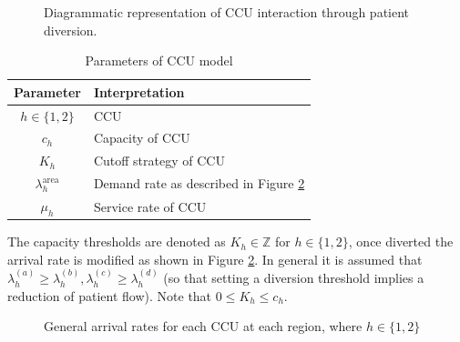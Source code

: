 \documentclass[a4paper,11pt]{article}
\begin{document}
\begin{figure}[!htbp]
\begin{center}
\caption{Diagrammatic representation of CCU interaction through patient diversion.}\label{diagramofdiversion}
\end{center}
\end{figure}


\begin{table}[!hbtp]
\begin{center}
\begin{tabular}{cl}
\toprule
Parameter & Interpretation\\
\midrule
$h\in\{1,2\}$& CCU\\
$c_h$& Capacity of CCU\\
$K_h$& Cutoff strategy of CCU\\
$\lambda_{h}^{\text{area}}$& Demand rate as described in Figure \ref{arrivalrateregions}\\
$\mu_{h}$&Service rate of CCU\\
\toprule
\end{tabular}
\caption{Parameters of CCU model}\label{tab:parameters1}
\end{center}
\end{table}

The capacity thresholds are denoted as $K_{h}\in\mathbb{Z}$ for $h\in\{1,2\}$, once diverted the arrival rate is modified as shown in Figure \ref{arrivalrateregions}.
In general it is assumed that $\lambda_h^{(a)}\geq \lambda_{h}^{(b)}, \lambda_{h}^{(c)}\geq \lambda_{h}^{(d)}$ (so that setting a diversion threshold implies a reduction of patient flow).
Note that $0\leq K_h\leq c_h$.

\begin{figure}[!htbp]
\begin{center}
\caption{General arrival rates for each CCU at each region, where $h\in\{1, 2\}$} \label{arrivalrateregions}
\end{center}
\end{figure}
\end{document}
